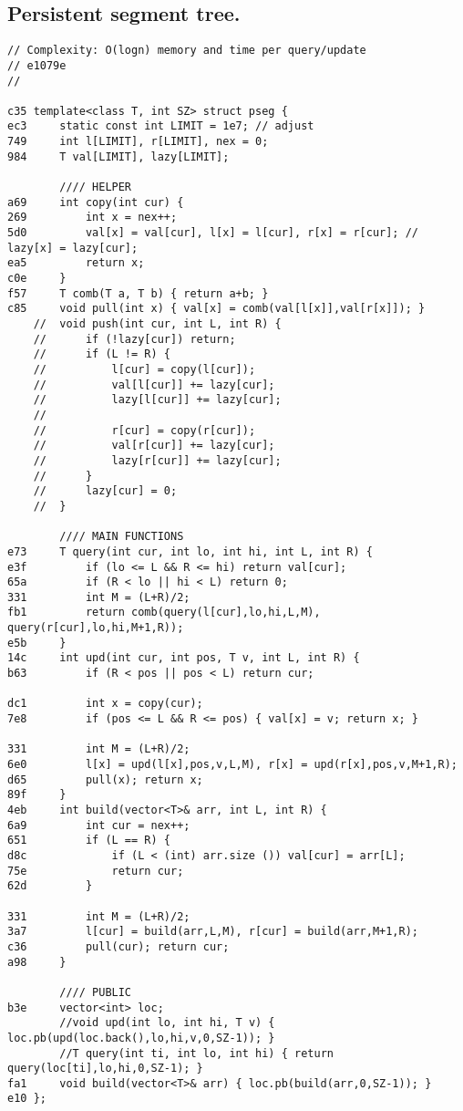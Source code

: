 \documentclass[11pt, a4paper, twoside]{article}
\begin{document}
\subsection{Persistent segment tree.}
\begin{lstlisting}
// Complexity: O(logn) memory and time per query/update
// e1079e
//

c35 template<class T, int SZ> struct pseg {
ec3     static const int LIMIT = 1e7; // adjust
749     int l[LIMIT], r[LIMIT], nex = 0;
984     T val[LIMIT], lazy[LIMIT];
        
        //// HELPER
a69     int copy(int cur) {
269         int x = nex++;
5d0         val[x] = val[cur], l[x] = l[cur], r[x] = r[cur]; // lazy[x] = lazy[cur];
ea5         return x;
c0e     }
f57     T comb(T a, T b) { return a+b; }
c85     void pull(int x) { val[x] = comb(val[l[x]],val[r[x]]); } 
    //  void push(int cur, int L, int R) { 
    //      if (!lazy[cur]) return;
    //      if (L != R) {
    //          l[cur] = copy(l[cur]);
    //          val[l[cur]] += lazy[cur];
    //          lazy[l[cur]] += lazy[cur];
    //          
    //          r[cur] = copy(r[cur]);
    //          val[r[cur]] += lazy[cur];
    //          lazy[r[cur]] += lazy[cur];
    //      }
    //      lazy[cur] = 0;
    //  }
     
        //// MAIN FUNCTIONS
e73     T query(int cur, int lo, int hi, int L, int R) {  
e3f         if (lo <= L && R <= hi) return val[cur];
65a         if (R < lo || hi < L) return 0;
331         int M = (L+R)/2;
fb1         return comb(query(l[cur],lo,hi,L,M), query(r[cur],lo,hi,M+1,R));
e5b     }
14c     int upd(int cur, int pos, T v, int L, int R) {
b63         if (R < pos || pos < L) return cur;
            
dc1         int x = copy(cur);
7e8         if (pos <= L && R <= pos) { val[x] = v; return x; }
            
331         int M = (L+R)/2;
6e0         l[x] = upd(l[x],pos,v,L,M), r[x] = upd(r[x],pos,v,M+1,R);
d65         pull(x); return x;
89f     }
4eb     int build(vector<T>& arr, int L, int R) {
6a9         int cur = nex++;
651         if (L == R) {
d8c             if (L < (int) arr.size ()) val[cur] = arr[L];
75e             return cur;
62d         }
            
331         int M = (L+R)/2;
3a7         l[cur] = build(arr,L,M), r[cur] = build(arr,M+1,R);
c36         pull(cur); return cur;
a98     }
        
        //// PUBLIC
b3e     vector<int> loc;
        //void upd(int lo, int hi, T v) { loc.pb(upd(loc.back(),lo,hi,v,0,SZ-1)); }
        //T query(int ti, int lo, int hi) { return query(loc[ti],lo,hi,0,SZ-1); }
fa1     void build(vector<T>& arr) { loc.pb(build(arr,0,SZ-1)); }
e10 };
\end{lstlisting}
\end{document}
